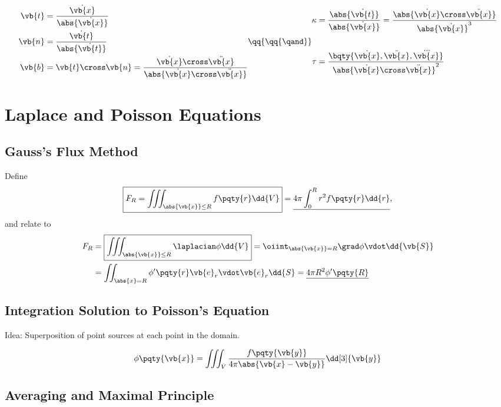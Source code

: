 \documentclass{article}
\begin{document}
\[
    \begin{aligned}
        \vb{t} &= \frac{\dot{\vb{x}}}{\abs{\dot{\vb{x}}}} \\
        \vb{n} &= \frac{\dot{\vb{t}}}{\abs{\dot{\vb{t}}}} \\
        \vb{b} &= \vb{t} \cross \vb{n} = \frac{\dot{\vb{x}} \cross \ddot{\vb{x}}}{\abs{\dot{\vb{x}} \cross \ddot{\vb{x}}}}
    \end{aligned}
    \qq{\qq{\qand}}
    \begin{aligned}
        \kappa &= \frac{\abs{\dot{\vb{t}}}}{\abs{\dot{\vb{x}}}} = \frac{\abs{\dot{\vb{x}} \cross \ddot{\vb{x}}}}{\abs{\dot{\vb{x}}}^3} \\ \\
        \tau &= \frac{\bqty{\dot{\vb{x}}, \ddot{\vb{x}}, \dddot{\vb{x}}}}{\abs{\dot{\vb{x}} \cross \ddot{\vb{x}}}^2}
    \end{aligned}
\]

\section*{Laplace and Poisson Equations}

\subsection*{Gauss's Flux Method}

Define
\[
    \boxed{F_R = \iiint_{\abs{\vb{x}} \leq R} f\pqty{r} \dd{V}} = \underline{4 \pi \int_0^R r^2 f\pqty{r} \dd{r}},
\]
and relate to
\begin{align*}
    F_R &= \boxed{\iiint_{\abs{\vb{x}} \leq R} \laplacian \phi \dd{V}} = \oiint_{\abs{\vb{x}} = R} \grad \phi \vdot \dd{\vb{S}} \\
    &= \iint_{\abs{x} = R} \phi' \pqty{r} \vb{e}_r \vdot \vb{e}_r \dd{S} = \underline{4 \pi R^2 \phi' \pqty{R}}
\end{align*}

\subsection*{Integration Solution to Poisson's Equation}

Idea: Superposition of point sources at each point in the domain.

\[
    \phi\pqty{\vb{x}} = \iiint_{V} \frac{f\pqty{\vb{y}}}{4 \pi \abs{\vb{x} - \vb{y}}} \dd[3]{\vb{y}}
\]

\subsection*{Averaging and Maximal Principle}
\end{document}

